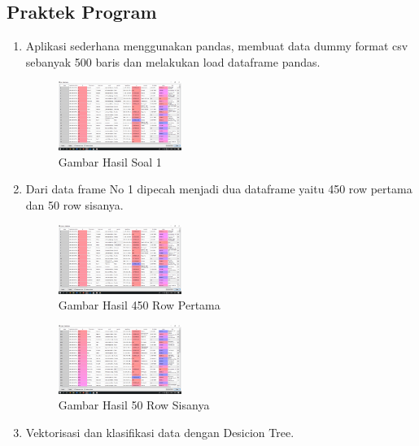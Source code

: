 \subsection{Praktek Program}
\begin{enumerate}

\item Aplikasi sederhana menggunakan pandas, membuat data dummy format csv sebanyak 500 baris dan melakukan load dataframe pandas.

	\hfill\break
	
	
	\begin{figure}[H]
	\centering
		\includegraphics[width=4cm]{figures/1174062/4/Teori/1.png}
		\caption{Gambar Hasil Soal 1}
	\end{figure}

\item Dari data frame No 1 dipecah menjadi dua dataframe yaitu 450 row pertama dan 50 row sisanya.\

	\hfill\break
	

	\begin{figure}[H]
	\centering
		\includegraphics[width=4cm]{figures/1174062/4/Teori/2 1.png}
		\caption{Gambar Hasil 450 Row Pertama}
	\end{figure}
	
	\begin{figure}[H]
	\centering
		\includegraphics[width=4cm]{figures/1174062/4/Teori/2 2.png}
		\caption{Gambar Hasil 50 Row Sisanya}
	\end{figure}

\item Vektorisasi dan klasifikasi data dengan Desicion Tree.


\end{enumerate}
